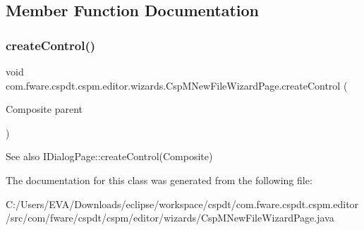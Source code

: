 \subsection{Member Function Documentation}
\mbox{\label{classcom_1_1fware_1_1cspdt_1_1cspm_1_1editor_1_1wizards_1_1_csp_m_new_file_wizard_page_aa939ca61b6f54c5d7f3d5fb942024bd9}} 
\subsubsection{\texorpdfstring{create\+Control()}{createControl()}}
{\footnotesize\ttfamily void com.\+fware.\+cspdt.\+cspm.\+editor.\+wizards.\+Csp\+M\+New\+File\+Wizard\+Page.\+create\+Control (\begin{DoxyParamCaption}\item[{Composite}]{parent }\end{DoxyParamCaption})\hspace{0.3cm}{\ttfamily [inline]}}

\begin{DoxySeeAlso}{See also}
I\+Dialog\+Page\+::create\+Control(\+Composite) 
\end{DoxySeeAlso}


The documentation for this class was generated from the following file\+:\begin{DoxyCompactItemize}
\item 
C\+:/\+Users/\+E\+V\+A/\+Downloads/eclipse/workspace/cspdt/com.\+fware.\+cspdt.\+cspm.\+editor/src/com/fware/cspdt/cspm/editor/wizards/Csp\+M\+New\+File\+Wizard\+Page.\+java\end{DoxyCompactItemize}
